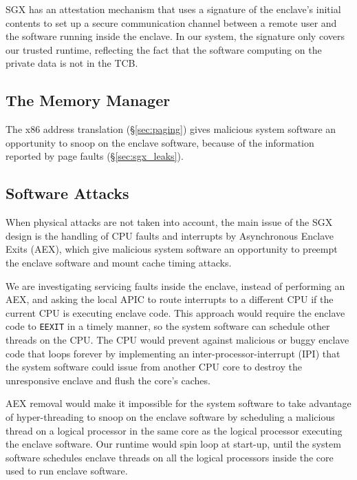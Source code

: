 SGX has an attestation mechanism that uses a signature of the enclave's initial
contents to set up a secure communication channel between a remote user and
the software running inside the enclave. In our system, the signature only
covers our trusted runtime, reflecting the fact that the software computing on
the private data is not in the TCB.

\subsection{The Memory Manager}
\label{sec:memory_manager}

The x86 address translation (\S \ref{sec:paging}) gives malicious system
software an opportunity to snoop on the enclave software, because of the
information reported by page faults (\S \ref{sec:sgx_leaks}).




\subsection{Software Attacks}

When physical attacks are not taken into account, the main issue of the SGX
design is the handling of CPU faults and interrupts by Asynchronous Enclave
Exits (AEX), which give malicious system software an opportunity to preempt the
enclave software and mount cache timing attacks.

We are investigating servicing faults inside the enclave, instead of performing
an AEX, and asking the local APIC to route interrupts to a different CPU if the
current CPU is executing enclave code. This approach would require the enclave
code to \texttt{EEXIT} in a timely manner, so the system software can schedule
other threads on the CPU. The CPU would prevent against malicious or buggy
enclave code that loops forever by implementing an inter-processor-interrupt
(IPI) that the system software could issue from another CPU core to destroy the
unresponsive enclave and flush the core's caches.

AEX removal would make it impossible for the system software to take advantage
of hyper-threading to snoop on the enclave software by scheduling a malicious
thread on a logical processor in the same core as the logical processor
executing the enclave software. Our runtime would spin loop at start-up, until
the system software schedules enclave threads on all the logical processors
inside the core used to run enclave software.

